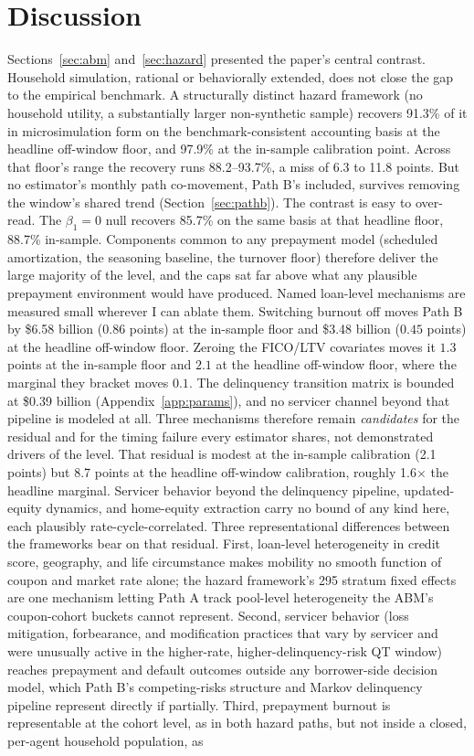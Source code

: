 \documentclass[12pt]{article}
\begin{document}
\section{Discussion}\label{sec:discussion}

Sections~\ref{sec:abm} and~\ref{sec:hazard} presented the paper's central contrast. Household simulation, rational or behaviorally extended, does not close the gap to the empirical benchmark. A structurally distinct hazard framework (no household utility, a substantially larger non-synthetic sample) recovers 91.3\% of it in microsimulation form on the benchmark-consistent accounting basis at the headline off-window floor, and 97.9\% at the in-sample calibration point. Across that floor's range the recovery runs 88.2--93.7\%, a miss of 6.3 to 11.8 points. But no estimator's monthly path co-movement, Path B's included, survives removing the window's shared trend (Section~\ref{sec:pathb}). The contrast is easy to over-read. The $\beta_1 = 0$ null recovers 85.7\% on the same basis at that headline floor, 88.7\% in-sample. Components common to any prepayment model (scheduled amortization, the seasoning baseline, the turnover floor) therefore deliver the large majority of the level, and the caps sat far above what any plausible prepayment environment would have produced. Named loan-level mechanisms are measured small wherever I can ablate them. Switching burnout off moves Path B by \$6.58 billion ($0.86$ points) at the in-sample floor and \$3.48 billion ($0.45$ points) at the headline off-window floor. Zeroing the FICO/LTV covariates moves it $1.3$ points at the in-sample floor and $2.1$ at the headline off-window floor, where the marginal they bracket moves $0.1$. The delinquency transition matrix is bounded at \$0.39 billion (Appendix~\ref{app:params}), and no servicer channel beyond that pipeline is modeled at all. Three mechanisms therefore remain \emph{candidates} for the residual and for the timing failure every estimator shares, not demonstrated drivers of the level. That residual is modest at the in-sample calibration (2.1 points) but 8.7 points at the headline off-window calibration, roughly 1.6$\times$ the headline marginal. Servicer behavior beyond the delinquency pipeline, updated-equity dynamics, and home-equity extraction carry no bound of any kind here, each plausibly rate-cycle-correlated. Three representational differences between the frameworks bear on that residual. First, loan-level heterogeneity in credit score, geography, and life circumstance makes mobility no smooth function of coupon and market rate alone; the hazard framework's 295 stratum fixed effects are one mechanism letting Path A track pool-level heterogeneity the ABM's coupon-cohort buckets cannot represent. Second, servicer behavior (loss mitigation, forbearance, and modification practices that vary by servicer and were unusually active in the higher-rate, higher-delinquency-risk QT window) reaches prepayment and default outcomes outside any borrower-side decision model, which Path B's competing-risks structure and Markov delinquency pipeline represent directly if partially. Third, prepayment burnout is representable at the cohort level, as in both hazard paths, but not inside a closed, per-agent household population, as 
\end{document}
